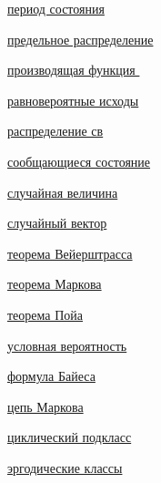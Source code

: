 \documentclass[a4paper,100pt]{article}
\theoremstyle{indented}
\theoremstyle{definition}
\theoremstyle{remark}
\begin{document}
\begin{multicols}{2}
\hyperlink{n39}{период состояния} \ 

\hyperlink{n34}{предельное распределение} \ 

\hyperlink{n26}{производящая функция } \ 

\hyperlink{n3}{равновероятные исходы} \ 

\hyperlink{n9}{распределение св} \ 

\hyperlink{n37}{сообщающиеся состояние} \ 

\hyperlink{n8}{случайная величина} \ 

\hyperlink{n18}{случайный вектор} \ 

\hyperlink{n23}{теорема Вейерштрасса} \ 

\hyperlink{n35}{теорема Маркова} \ 

\hyperlink{n43}{теорема Пойа} \

\hyperlink{n4}{условная вероятность} \ 

\hyperlink{n5}{формула Байеса} \ 

\hyperlink{n29}{цепь Маркова} \ 

\hyperlink{n41}{циклический подкласс} \ 

\hyperlink{n38}{эргодические классы} \ 

\end{multicols}
\end{document}

